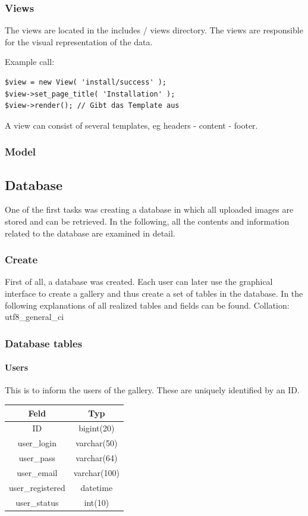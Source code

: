 \documentclass[a4paper,12pt,oneside]{article} %
\begin{document}
\subsubsection*{Views}

The views are located in the 
includes / views
directory. The views are responsible for the visual representation
of the data.

Example call:

\begin{lstlisting}
$view = new View( 'install/success' ); 
$view->set_page_title( 'Installation' );  
$view->render(); // Gibt das Template aus
\end{lstlisting}

A view can consist of several templates, eg headers - content - footer.


\subsubsection*{Model}


\subsection{Database}

One of the first tasks was creating a database in which all uploaded
images are stored and can be retrieved. In the following, all the
contents and information related to the database are examined in detail.


\subsubsection{Create}

First of all, a database was created. Each user can later use the graphical
interface to create a gallery and thus create a set of tables in the
database. In the following explanations of all realized tables and fields
can be found. Collation: utf8\_general\_ci


\subsubsection{Database tables}


\paragraph*{Users}

This is to inform the users of the gallery. These are uniquely identified
by an ID.
\begin{tabular}{|c|c|}
\hline 
Feld & Typ\tabularnewline
\hline 
\hline 
ID & bigint(20)\tabularnewline
\hline 
user\_login & varchar(50)\tabularnewline
\hline 
user\_pass & varchar(64)\tabularnewline
\hline 
user\_email & varchar(100)\tabularnewline
\hline 
user\_registered & datetime\tabularnewline
\hline 
user\_status & int(10)\tabularnewline
\hline 
\end{tabular}
\end{document}
